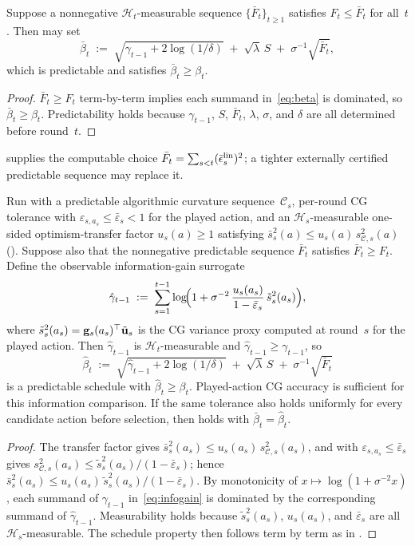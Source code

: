 \documentclass[twoside]{article}
\newcommand{\Calg}{\mathcal{C}}                 %
\newcommand{\cHist}{\mathcal{H}}                %
\begin{document}
\begin{corollary}\label{cor:beta-constructive}
Suppose a nonnegative $\cHist_t$-measurable sequence
$\{\bar F_t\}_{t\ge 1}$
satisfies $F_t \le \bar F_t$ for all~$t$.
Then  may set
\[
  \bar\beta_t \;:=\;
  \sqrt{\gamma_{t-1} + 2\log(1/\delta)}
  \;+\; \sqrt{\lambda}\,S
  \;+\; \sigma^{-1}\sqrt{\bar F_t},
\]
which is predictable and satisfies $\bar\beta_t \ge \beta_t$.
\end{corollary}
\begin{proof}
$\bar F_t \ge F_t$ term-by-term implies each summand in~\eqref{eq:beta}
is dominated, so $\bar\beta_t \ge \beta_t$.
Predictability holds because $\gamma_{t-1}$, $S$, $\bar F_t$, $\lambda$,
$\sigma$, and $\delta$ are all determined before round~$t$.
\end{proof}

\noindent
{} supplies the computable choice
$\bar F_t=\sum_{s<t}(\bar\epsilon_s^{\rm lin})^2$; a tighter externally
certified predictable sequence may replace it.

\begin{corollary}\label{cor:gammahat}
Run  with a predictable algorithmic curvature
sequence~$\Calg_s$, per-round CG tolerance with
$\varepsilon_{s,a_s}\le\bar\varepsilon_s<1$ for the played action, and an
$\cHist_s$-measurable one-sided optimism-transfer factor $u_s(a)\ge1$ satisfying
$\bar s_s^2(a)\le u_s(a)\,s_{\Calg,s}^2(a)$ ().
Suppose also that the nonnegative predictable sequence $\bar F_t$ satisfies
$\bar F_t\ge F_t$.
Define the observable information-gain surrogate
\[
  \hat\gamma_{t-1} \;:=\;
  \sum_{s=1}^{t-1}\log\!\Bigl(1+\sigma^{-2}\,
  \frac{u_s(a_s)}{1-\bar\varepsilon_s}\,
  \tilde s_s^2(a_s)\Bigr),
\]
where $\tilde s_s^2(a_s)=\mathbf{g}_s(a_s)^\top\tilde{\mathbf{u}}_s$ is the CG variance
proxy computed at round~$s$ for the played action.
Then $\hat\gamma_{t-1}$ is $\cHist_t$-measurable and
$\hat\gamma_{t-1}\ge\gamma_{t-1}$, so
\[
  \hat\beta_t \;:=\;
  \sqrt{\hat\gamma_{t-1}+2\log(1/\delta)}
  \;+\;\sqrt{\lambda}\,S
  \;+\;\sigma^{-1}\sqrt{\bar F_t}
\]
is a predictable schedule with $\hat\beta_t\ge\beta_t$.  Played-action CG
accuracy is sufficient for this information comparison.  If the same tolerance
also holds uniformly for every candidate action before selection, then
 holds with $\bar\beta_t=\hat\beta_t$.
\end{corollary}
\begin{proof}
The transfer factor gives
$\bar s_s^2(a_s)\le u_s(a_s)\,s_{\Calg,s}^2(a_s)$, and 
with $\varepsilon_{s,a_s}\le\bar\varepsilon_s$ gives
$s_{\Calg,s}^2(a_s)\le\tilde s_s^2(a_s)/(1-\bar\varepsilon_s)$;
hence
$\bar s_s^2(a_s)\le u_s(a_s)\,\tilde s_s^2(a_s)/(1-\bar\varepsilon_s)$.
By monotonicity of $x\mapsto\log(1+\sigma^{-2}x)$, each summand of
$\gamma_{t-1}$ in~\eqref{eq:infogain} is dominated by the corresponding
summand of $\hat\gamma_{t-1}$.
Measurability holds because $\tilde s_s^2(a_s)$, $u_s(a_s)$, and
$\bar\varepsilon_s$ are all $\cHist_s$-measurable.
The schedule property then follows term by term as in
.
\end{proof}
\end{document}
